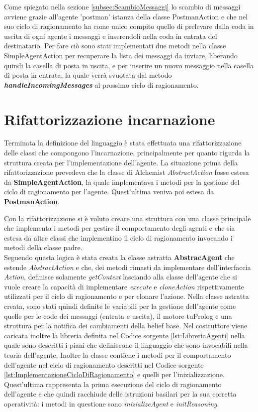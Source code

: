 \documentclass[12pt,a4paper,openright,twoside]{report}
\begin{document}
\bigskip

Come spiegato nella sezione \ref{subsec:ScambioMessaggi} lo scambio di messaggi avviene grazie all'agente 'postman' istanza della classe PostmanAction e che nel suo ciclo di ragionamento ha come unico compito quello di prelevare dalla coda in uscita di ogni agente i messaggi e inserendoli nella coda in entrata del destinatario. Per fare ci\`o sono stati implementati due metodi nella classe SimpleAgentAction per recuperare la lista dei messaggi da inviare, liberando quindi la casella di posta in uscita, e per inserire un nuovo messaggio nella casella di posta in entrata, la quale verr\`a svuotata dal metodo \textbf{\textit{handleIncomingMessages}} al prossimo ciclo di ragionamento.


\section{Rifattorizzazione incarnazione}
Terminata la definizione del linguaggio \`e stata effettuata una rifattorizzazione delle classi che compongono l'incarnazione, principalmente per quanto rigurda la struttura creata per l'implementazione dell'agente.
La situazione prima della rifattorizzazione prevedeva che la classe di Alchemist \textit{AbstractAction} fosse estesa da \textbf{SimpleAgentAction}, la quale implementava i metodi per la gestione del ciclo di ragionamento per l'agente. Quest'ultima veniva poi estesa da \textbf{PostmanAction}.

Con la rifattorizzazione si \`e voluto creare una struttura con una classe principale che implementa i metodi per gestire il comportamento degli agenti e che sia estesa da altre classi che implementino il ciclo di ragionamento invocando i metodi della classe padre.
\\
Seguendo questa logica \`e stata creata la classe astratta \textbf{AbstracAgent} che estende \textit{AbstractAction} e che, dei metodi rimasti da implementare dell'interfaccia \textit{Action}, definisce solamente \textit{getContext} lasciando alla classe dell'agente che si vuole creare la capacit\`a di implementare \textit{execute} e \textit{cloneAction} rispettivamente utilizzati per il ciclo di ragionamento e per clonare l'azione.
Nella classe astratta creata, sono stati quindi definite le variabili per la gestione dell'agente come quelle per le code dei messaggi (entrata e uscita), il motore tuProlog e una struttura per la notifica dei cambiamenti della belief base. Nel costruttore viene caricata inoltre la libreria definita nel Codice sorgente \ref{lst:LibreriaAgenti} nella quale sono descritti i piani che definiscono il linguaggio che sono invocabili nella teoria dell'agente. Inoltre la classe contiene i metodi per il comportamento dell'agente nel ciclo di ragionamento descritti nel Codice sorgente \ref{lst:ImplementazioneCicloDiRagionamento} e quelli per l'inizializzazione. Quest'ultima rappresenta la prima esecuzione del ciclo di ragionamento dell'agente e che quindi racchiude delle istruzioni basilari per la sua corretta operativit\`a: i metodi in questione sono \textit{inizializeAgent} e \textit{initReasoning}.
\end{document}
